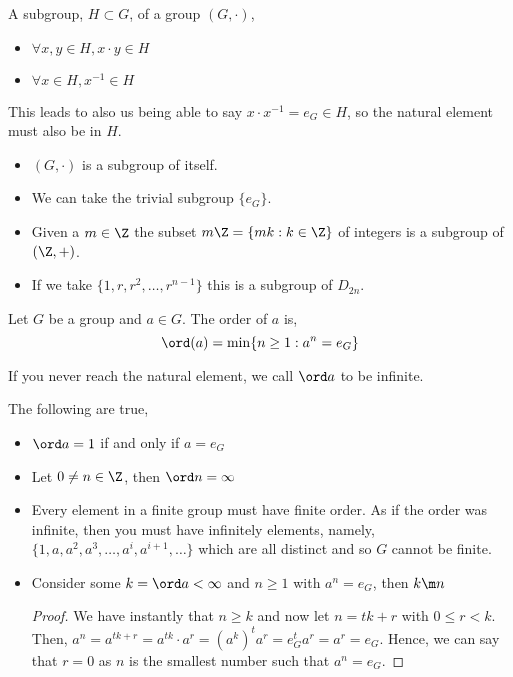 \begin{ndefi}[Subgroup]
  A subgroup, $H \subset G$, of a group $(G, \cdot)$,
  \begin{itemize}
    \item $\forall x, y \in H, x \cdot y \in H$
    \item $\forall x \in H, x^{-1} \in H$
  \end{itemize}
\end{ndefi}

This leads to also us being able to say $x \cdot x ^{-1} = e_G \in H$, so the natural element must also be in $H$.

\begin{eg}
  \begin{itemize}
    \item $(G, \cdot)$ is a subgroup of itself.
    \item We can take the trivial subgroup $\{e_G\}$.
    \item Given a $m \in \Z$ the subset $m\Z = \{mk : k \in \Z\}$ of integers is a subgroup of $(\Z, +)$.
    \item If we take $\{1, r, r^2, \dots, r^{n-1}\}$ this is a subgroup of $D_{2n}$.
  \end{itemize}
\end{eg}

\begin{ndefi}
  Let $G$ be a group and $a \in G$. The order of $a$ is,
  $$ \ord (a) = \min \{n \ge 1 : a^n = e_G\} $$
\end{ndefi}
If you never reach the natural element, we call $\ord a$ to be infinite.

\begin{nlemma}
  The following are true,
  \begin{itemize}
    \item $\ord a = 1$ if and only if $a = e_G$
    \item Let $0 \ne n \in \Z$, then $\ord n = \infty$
    \item Every element in a finite group must have finite order. As if the order was infinite, then you must have infinitely elements, namely, $\{1, a, a^2, a^3, \dots, a^i, a^{i+1}, \dots\}$ which are all distinct and so $G$ cannot be finite.
    \item Consider some $k = \ord a < \infty$ and $n \ge 1$ with $a^n = e_G$, then $k \m n$
    \begin{proof}
      We have instantly that $n \ge k$ and now let $n = tk + r$ with $0 \le r < k$. Then, $a^n = a^{tk+r} = a^{tk} \cdot a^r = (a^k)^ta^r = e_G^ta^r = a^r = e_G$. Hence, we can say that $r = 0$ as $n$ is the smallest number such that $a^n = e_G$.
    \end{proof}
  \end{itemize}
\end{nlemma}

